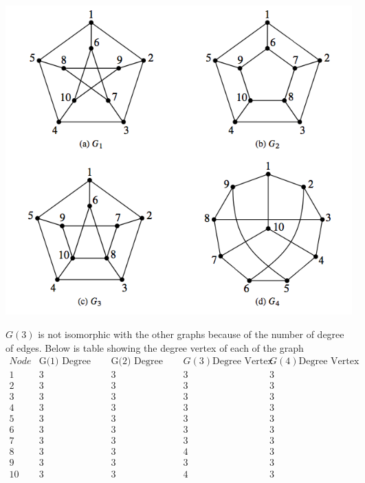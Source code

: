 \documentclass[12pt]{article}
\begin{document}
\begin{enumerate}
\begin{center}
\includegraphics[scale=0.35]{all.png}
\end{center}

$G(3)$ is not isomorphic with the other graphs because of the number of degree of edges. Below is table showing the degree vertex of each of the graph
\begin{displaymath}
\begin{array}{|c|c|c|c|c|}
    Node & \text{G(1) Degree Vertex} &  \text{G(2) Degree Vertex} & G(3) \text{Degree Vertex} & G(4) \text{Degree Vertex} \\
\hline
1 & 3  & 3 & 3 & 3  \\
2 & 3  & 3 & 3 & 3  \\
3 & 3  & 3 & 3 & 3  \\
4 & 3  & 3 & 3 & 3  \\
5 & 3  & 3 & 3 & 3  \\
6 & 3  & 3 & 3 & 3  \\
7 & 3  & 3 & 3 & 3  \\
8 & 3  & 3 & 4 & 3  \\
9 & 3  & 3 & 3 & 3  \\
10 & 3  & 3 & 4 & 3  \\
\end{array}
\end{displaymath}


\end{enumerate}
\end{document}
